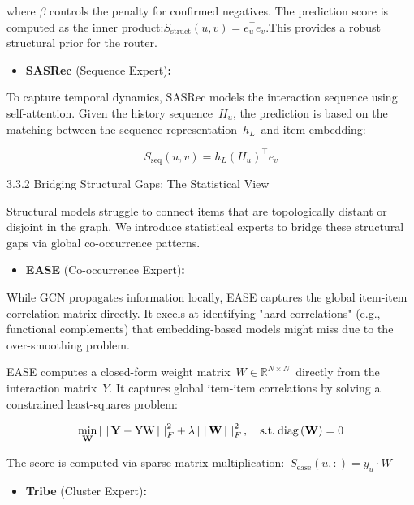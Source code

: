 \documentclass[]{article}
\begin{document}
where \(\beta\) controls the penalty for confirmed negatives. The
prediction score is computed as the inner
product:\(S_{\text{struct}}\left( u,v \right) = e_{u}^{\top}e_{v}\).This
provides a robust structural prior for the router.

\begin{itemize}
\item
  \textbf{SASRec} (Sequence Expert)\textbf{:}
\end{itemize}

To capture temporal dynamics, SASRec models the interaction sequence
using self-attention. Given the history sequence~\(H_{u}\), the
prediction is based on the matching between the sequence
representation~\(h_{L}\)~and item embedding:

\[S_{\text{seq}}\left( u,v \right) = h_{L}\left( H_{u} \right)^{\top}e_{v}\]

3.3.2 Bridging Structural Gaps: The Statistical View

Structural models struggle to connect items that are topologically
distant or disjoint in the graph. We introduce statistical experts to
bridge these structural gaps via global co-occurrence patterns.

\begin{itemize}
\item
  \textbf{EASE} (Co-occurrence Expert)\textbf{:}
\end{itemize}

While GCN propagates information locally, EASE captures the global
item-item correlation matrix directly. It excels at identifying "hard
correlations" (e.g., functional complements) that embedding-based models
might miss due to the over-smoothing problem.

EASE computes a closed-form weight
matrix~\(W \in \mathbb{R}^{N \times N}\)~directly from the interaction
matrix~\(Y\). It captures global item-item correlations by solving a
constrained least-squares problem:

\[\min_{\mathbf{W}}\left| \  \right|\mathbf{Y} - \mathbf{\text{YW}}\left| \  \right|_{F}^{2} + \lambda\left| \  \right|\mathbf{W}\left| \  \right|_{F}^{2},\quad\text{s.t.\:diag}\left( \mathbf{W} \right) = 0\]

The score is computed via sparse matrix
multiplication:~\(S_{\text{ease}}\left( u,: \right) = y_{u} \cdot W\)

\begin{itemize}
\item
  \textbf{Tribe} (Cluster Expert)\textbf{:}
\end{itemize}
\end{document}

